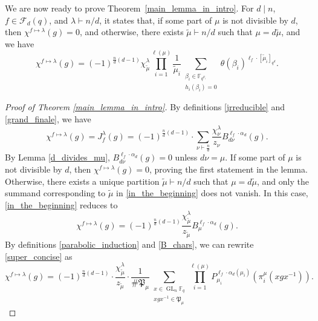 \documentclass[10pt]{article}
\theoremstyle{definition}
\DeclareMathOperator{\GL}{GL}
\newcommand{\F}{\mathbb{F}}
\newcommand{\CF}{\mathcal{F}}
\newcommand{\para}{\mathfrak{P}}
\newcommand{\te}{\theta}
\begin{document}
We are now ready to prove Theorem~\ref{main_lemma_in_intro}.
For \(d \mid n\), \(f \in \CF_d (q)\), and \(\lambda \vdash n/d\), it states that,
if some part of \(\mu\) is not divisible by \(d\), then \(\chi^{f \mapsto \lambda} (g) = 0\), and otherwise, there exists \(\tilde{\mu} \vdash n/d\) such that \(\mu = d \tilde{\mu}\), and we have
\begin{equation}
\chi^{f \mapsto \lambda} (g)
= (-1)^{\tfrac{n}{d}(d-1)}
\chi^\lambda_{\tilde{\mu}}
\prod_{i = 1}^{\ell(\mu)}
\frac{1}{\tilde{\mu}_i}
\sum_{\substack{ \beta_i \in \F_{q^{\mu_i}} \\ h_i(\beta_i) = 0}} \te (\beta_i)^{\ell_f \cdot [\tilde{\mu}_i]_{q^d}}.
\end{equation}



\begin{proof}[Proof of Theorem \ref{main_lemma_in_intro}]
By definitions \eqref{jrreducible} and \eqref{grand_finale}, we have
\begin{equation}
\label{in_the_beginning}
\chi^{f \mapsto \lambda} (g)
= J_f^\lambda (g) = (-1)^{\tfrac{n}{d} (d-1)} \cdot \sum_{\nu \vdash \tfrac{n}{d}} \frac{\chi^\lambda_\nu}{z_\nu} B_{d \nu}^{\ell_f \cdot \alpha_{d}} (g).
\end{equation}
By Lemma \ref{d_divides_mu}, $B_{d \nu}^{\ell_f \cdot \alpha_d} (g) = 0$ unless $d \nu = \mu$.
If some part of $\mu$ is not divisible by $d$, then $\chi^{f \mapsto \lambda}(g) = 0$, proving the first statement in the lemma.
Otherwise, there exists a unique partition \(\tilde{\mu} \vdash n/d\) such that \(\mu = d \tilde{\mu}\),
and only the summand corresponding to \(\tilde{\mu}\) in \eqref{in_the_beginning} does not vanish.
In this case, \eqref{in_the_beginning} reduces to
\begin{equation}
\label{super_concise}
\chi^{f \mapsto \lambda} (g) = (-1)^{\frac{n}{d}(d-1)} \frac{\chi^\lambda_{\tilde{\mu}}}{z_{\tilde{\mu}}} B_{\mu}^{\ell_f \cdot \alpha_d} (g).
\end{equation}
By definitions \eqref{parabolic_induction} and \eqref{B_chars}, we can rewrite \eqref{super_concise} as
\begin{equation}
\label{expandedB_eqn}
\chi^{f \mapsto \lambda} (g)
= (-1)^{\tfrac{n}{d} (d-1)} \cdot \frac{\chi^\lambda_{\tilde{\mu}}}{z_{\tilde{\mu}}} \cdot \frac{1}{\# \para_{\mu}} \sum_{\substack{x \in \GL_n \F_q \\ xgx^{-1} \in \para_{\mu}}} \prod_{i = 1}^{\ell(\mu)} P_{\mu_i}^{\ell_f \cdot \alpha_d (\mu_i)} (\pi^\mu_i (xgx^{-1})).
\end{equation}


\end{proof}
\end{document}
